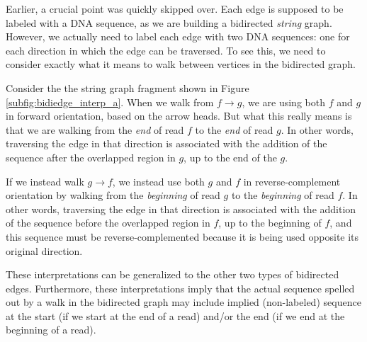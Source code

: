 \documentclass[10pt]{article}
\newcommand{\Subfigure}[1]{Figure \ref{#1}}
\begin{document}
Earlier, a crucial point was quickly skipped over.  Each edge is supposed to be
labeled with a DNA sequence, as we are building a bidirected {\em string} graph.
However, we actually need to label each edge with two DNA sequences: one for
each direction in which the edge can be traversed.  To see this, we need to
consider exactly what it means to walk between vertices in the bidirected graph.

Consider the the string graph fragment shown in
\Subfigure{subfig:bidiedge_interp_a}.  When we walk from $f \to g$, we are using
both $f$ and $g$ in forward orientation, based on the arrow heads.  But what
this really means is that we are walking from the {\em end} of read $f$ to the
{\em end} of read $g$.  In other words, traversing the edge in that direction is
associated with the addition of the sequence after the overlapped region in $g$,
up to the end of the $g$.

If we instead walk $g \to f$, we instead use both $g$ and $f$ in
reverse-complement orientation by walking from the {\em beginning} of read $g$
to the {\em beginning} of read $f$.  In other words, traversing the edge in that
direction is associated with the addition of the sequence before the overlapped
region in $f$, up to the beginning of $f$, and this sequence must be
reverse-complemented because it is being used opposite its original direction.

These interpretations can be generalized to the other two types of bidirected
edges.  Furthermore, these interpretations imply that the actual sequence spelled
out by a walk in the bidirected graph may include implied (non-labeled) sequence
at the start (if we start at the end of a read) and/or the end (if we end at the
beginning of a read).
\end{document}
